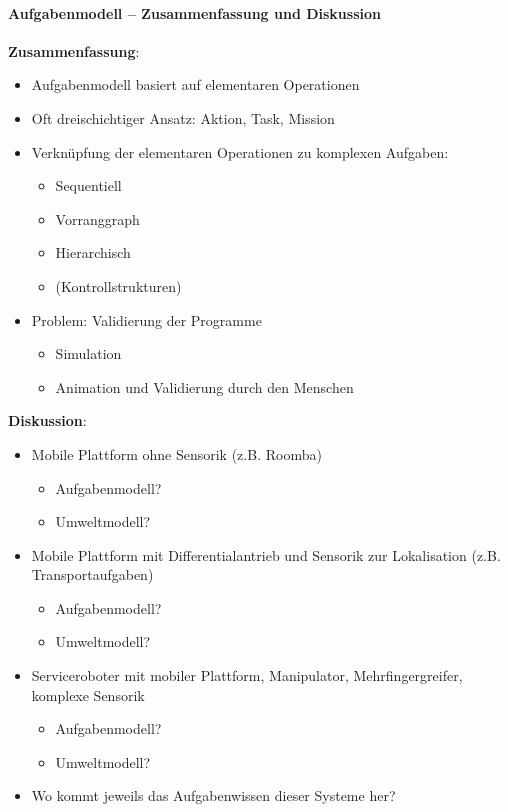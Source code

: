 \paragraph*{Aufgabenmodell -- Zusammenfassung und Diskussion}
\textbf{Zusammenfassung}:
\begin{itemize}
\item Aufgabenmodell basiert auf elementaren Operationen
\item Oft dreischichtiger Ansatz: Aktion, Task, Mission
\item Verknüpfung der elementaren Operationen zu komplexen Aufgaben:
\begin{itemize}
\item Sequentiell
\item Vorranggraph
\item  Hierarchisch
\item (Kontrollstrukturen)
\end{itemize}
\item Problem: Validierung der Programme
\begin{itemize}
\item Simulation
\item Animation und Validierung durch den Menschen
\end{itemize}
\end{itemize}

\textbf{Diskussion}:
\begin{itemize}
\item Mobile Plattform ohne Sensorik (z.B. Roomba)
\begin{itemize}
\item Aufgabenmodell?
\item Umweltmodell?
\end{itemize}
\item Mobile Plattform mit Differentialantrieb und Sensorik zur Lokalisation (z.B. Transportaufgaben)
\begin{itemize}
\item Aufgabenmodell?
\item Umweltmodell?
\end{itemize}
\item Serviceroboter mit mobiler Plattform, Manipulator, Mehrfingergreifer, komplexe Sensorik\begin{itemize}
\item Aufgabenmodell?
\item Umweltmodell?
\end{itemize}
\item Wo kommt jeweils das Aufgabenwissen dieser Systeme her?
\end{itemize}